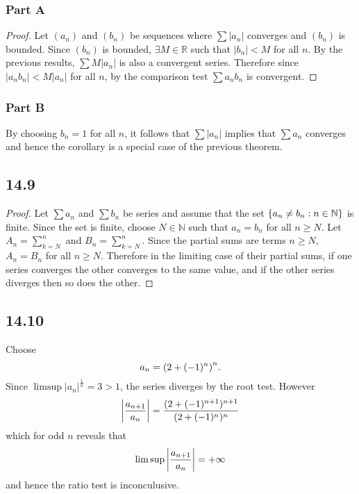 \documentclass[12pt,titlepage]{extarticle}
\begin{document}
\subsubsection*{Part A}
\begin{proof}
    Let $(a_n)$ and $(b_n)$ be sequences where $\sum |a_n|$ converges and $(b_n)$ is bounded. Since $(b_n)$ is bounded, $\exists M \in \mathbb{R}$ such that $|b_n| < M$ for all $n$. By the previous results, $\sum M|a_n|$ is also a convergent series. Therefore since $|a_n b_n| < M|a_n|$ for all $n$, by the comparison test $\sum a_n b_n$ is convergent.
\end{proof}

\subsubsection*{Part B}
By choosing $b_n = 1$ for all $n$, it follows that $\sum |a_n|$ implies that $\sum a_n$ converges and hence the corollary is a special case of the previous theorem.

\subsection*{14.9}
\begin{proof}
    Let $\sum a_n$ and $\sum b_n$ be series and assume that the set $\qty{a_n \neq b_n : n \in \mathbb{N}}$ is finite. Since the set is finite, choose $N \in \mathbb{N}$ such that $a_n = b_n$ for all $n \geq N$. Let $A_n = \sum_{k = N}^n$ and $B_n = \sum_{k = N}^n$. Since the partial sums are terms $n \geq N$, $A_n = B_n$ for all $n \geq N$. Therefore in the limiting case of their partial sums, if one series converges the other converges to the same value, and if the other series diverges then so does the other.
\end{proof}

\subsection*{14.10}
Choose
\[
    a_n = \qty(2+(-1)^n)^n
.\]
Since $\limsup |a_n|^\frac{1}{n} = 3 > 1$, the series diverges by the root test. However
\begin{align*}
    \qty|\frac{a_{n+1}}{a_n}| = \frac{(2+(-1)^{n+1})^{n+1}}{(2+(-1)^n)^n}
\end{align*}
which for odd $n$ reveals that
\[
    \limsup \qty|\frac{a_{n+1}}{a_n}| = +\infty
\]
and hence the ratio test is inconculusive.
\end{document}

